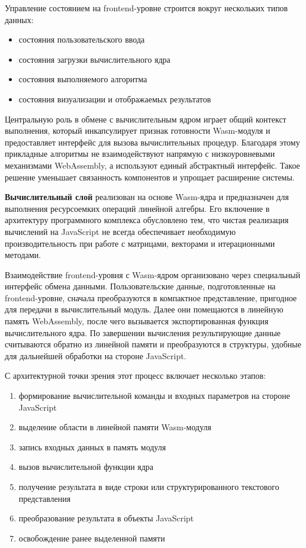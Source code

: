 \documentclass[12pt, oneside]{book}
\begin{document}
    \quad Управление состоянием на frontend-уровне строится вокруг нескольких типов данных:
    
    \begin{itemize}
        \item состояния пользовательского ввода
        \item состояния загрузки вычислительного ядра
        \item состояния выполняемого алгоритма
        \item состояния визуализации и отображаемых результатов
    \end{itemize}
    
    \quad Центральную роль в обмене с вычислительным ядром играет общий контекст выполнения, который инкапсулирует признак готовности Wasm-модуля и предоставляет интерфейс для вызова вычислительных процедур. Благодаря этому прикладные алгоритмы не взаимодействуют напрямую с низкоуровневыми механизмами WebAssembly, а используют единый абстрактный интерфейс. Такое решение уменьшает связанность компонентов и упрощает расширение системы.


    \quad \textbf{Вычислительный слой} реализован на основе Wasm-ядра и предназначен для выполнения ресурсоемких операций линейной алгебры. Его включение в архитектуру программного комплекса обусловлено тем, что чистая реализация вычислений на JavaScript не всегда обеспечивает необходимую производительность при работе с матрицами, векторами и итерационными методами.

    \quad Взаимодействие frontend-уровня с Wasm-ядром организовано через специальный интерфейс обмена данными. Пользовательские данные, подготовленные на frontend-уровне, сначала преобразуются в компактное представление, пригодное для передачи в вычислительный модуль. Далее они помещаются в линейную память WebAssembly, после чего вызывается экспортированная функция вычислительного ядра. По завершении вычисления результирующие данные считываются обратно из линейной памяти и преобразуются в структуры, удобные для дальнейшей обработки на стороне JavaScript.

    \quad С архитектурной точки зрения этот процесс включает несколько этапов:

    \begin{enumerate}
        \item формирование вычислительной команды и входных параметров на стороне JavaScript
        \item выделение области в линейной памяти Wasm-модуля
        \item запись входных данных в память модуля
        \item вызов вычислительной функции ядра
        \item получение результата в виде строки или структурированного текстового представления
        \item преобразование результата в объекты JavaScript
        \item освобождение ранее выделенной памяти
    \end{enumerate}
    
\end{document}
